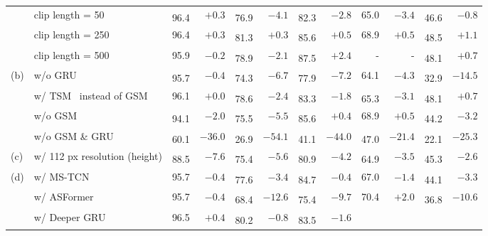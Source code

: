 \documentclass[runningheads]{llncs}
\newcommand{\nms}{\textsuperscript{\textdagger}}
\begin{document}
\begin{table*}[t]
{\begin{tabularx}{\textwidth}{ll rr rr rr rr rr}
        & \tabindent clip length = 50
            & \nms 96.4 & $+0.3$
            & \nms 76.9 & $-4.1$
            & \nms 82.3 & $-2.8$
            & 65.0 & $-3.4$
            & \nms 46.6 & $-0.8$ \\
        & \tabindent clip length = 250
            & 96.4 & $+0.3$
            & \nms 81.3 & $+0.3$
            & \nms 85.6 & $+0.5$
            & 68.9 & $+0.5$
            & \nms 48.5 & $+1.1$ \\
        & \tabindent clip length = 500
            & 95.9 & $-0.2$
            & \nms 78.9 & $-2.1$
            & \nms 87.5 & $+2.4$
            & - & -
            & \nms 48.1 & $+0.7$\\
        \midrule
        (b)
        & \tabindent w/o GRU
            & \nms 95.7 &  $-0.4$
            & \nms 74.3 & $-6.7$
            & \nms 77.9 & $-7.2$
            & 64.1 & $-4.3$
            & \nms 32.9 & $-14.5$ \\
        & \tabindent w/ TSM~\cite{tsm} instead of GSM
            & 96.1 & $+0.0$
            & \nms 78.6 & $-2.4$
            & \nms 83.3 & $-1.8$
            & \nms 65.3 & $-3.1$
            & \nms 48.1 & $+0.7$\\
        & \tabindent w/o GSM
            & \nms 94.1 & $-2.0$
            & \nms 75.5 & $-5.5$
            & \nms 85.6 & $+0.4$
            & 68.9 & $+0.5$
            & \nms 44.2 & $-3.2$ \\
        & \tabindent w/o GSM \& GRU
            & \nms 60.1 & $-36.0$
            & \nms 26.9 & $-54.1$
            & \nms 41.1 & $-44.0$
            & \nms 47.0 & $-21.4$
            & \nms 22.1 & $-25.3$ \\
        \midrule
        (c)
        & \tabindent w/ 112 px resolution (height)
            & \nms 88.5 & $-7.6$
            & \nms 75.4 & $-5.6$
            & \nms 80.9 & $-4.2$
            & \nms 64.9 & $-3.5$
            & \nms 45.3 & $-2.6$ \\
        \midrule
        (d)
        & \tabindent w/ MS-TCN
            & 95.7 &  $-0.4$
            & \nms 77.6 & $-3.4$
            & \nms 84.7 & $-0.4$
            & 67.0 & $-1.4$
            & \nms 44.1 & $-3.3$ \\
        & \tabindent w/ ASFormer
            & 95.7 &  $-0.4$
            & \nms 68.4 & $-12.6$
            & \nms 75.4 & $-9.7$
            & 70.4 & $+2.0$
            & \nms 36.8 & $-10.6$\\
        & \tabindent w/ Deeper GRU
            & 96.5 &  $+0.4$
            & \nms 80.2 & $-0.8$
            & \nms 83.5 & $-1.6$

\end{tabularx}}
\end{table*}
\end{document}
